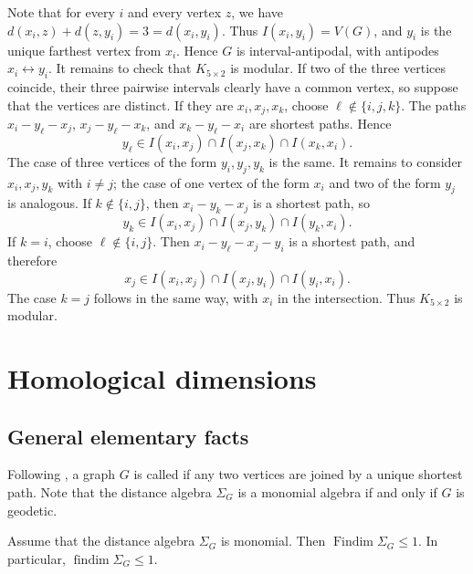 \documentclass[a4paper,leqno]{amsart}
\begin{document}
\begin{eg}
Note that for every $i$ and every vertex $z$, we have
$d(x_i,z)+d(z,y_i)=3=d(x_i,y_i)$. Thus $I(x_i,y_i)=V(G)$, and $y_i$ is the unique farthest vertex from $x_i$. Hence $G$ is interval-antipodal, with antipodes $x_i\leftrightarrow y_i$.
It remains to check that $K_{5\times 2}$ is modular. If two of the three vertices
coincide, their three pairwise intervals clearly have a common
vertex, so suppose that the vertices are distinct. If they are
$x_i,x_j,x_k$, choose $\ell\notin\{i,j,k\}$. The paths
$x_i-y_\ell-x_j$, $x_j-y_\ell-x_k$, and
$x_k-y_\ell-x_i$ are shortest paths. Hence
\[
y_\ell\in
I(x_i,x_j)\cap I(x_j,x_k)\cap I(x_k,x_i).
\]
The case of three vertices of the form $y_i,y_j,y_k$ is the same. It remains to consider $x_i,x_j,y_k$ with $i\neq j$; the case of one vertex of the form $x_i$ and two of the form $y_j$ is analogous. If $k\notin\{i,j\}$, then $x_i-y_k-x_j$ is a shortest path, so
\[
y_k\in
I(x_i,x_j)\cap I(x_j,y_k)\cap I(y_k,x_i).
\]
If $k=i$, choose $\ell\notin\{i,j\}$. Then
$x_i-y_\ell-x_j-y_i$ is a shortest path, and therefore
\[
x_j\in
I(x_i,x_j)\cap I(x_j,y_i)\cap I(y_i,x_i).
\]
The case $k=j$ follows in the same way, with $x_i$ in the
intersection. Thus $K_{5\times 2}$ is modular.
\end{eg}







\section{Homological dimensions}\label{sec:tree}

\subsection{General elementary facts}

Following \cite[Definition~2.1(4) and Remark~2.2]{AW24}, a graph $G$ is called  if any two vertices are joined by a unique shortest path. Note that the distance algebra $\Sigma_G$ is a monomial algebra if and only if $G$ is geodetic.

\begin{lem}\label{lem:mono-findim}
Assume that the distance algebra $\Sigma_G$ is monomial. Then $\operatorname{Findim}\Sigma_G\leq1$.
In particular, $\operatorname{findim}\Sigma_G\leq1$.
\end{lem}
\end{document}
